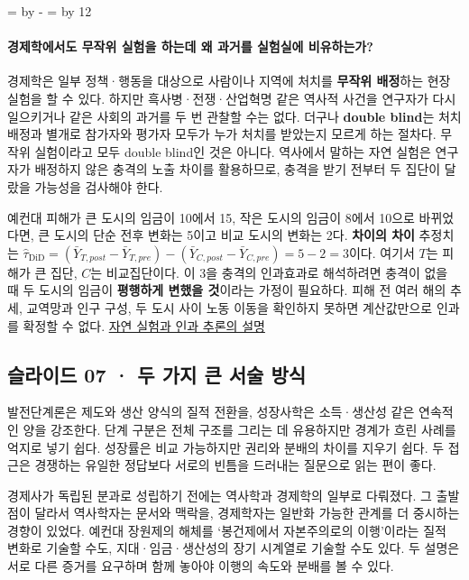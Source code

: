 \documentclass[10pt,a4paper]{article}
\newcommand{\ReserveQuestionSpace}{%
  \par\begingroup
  \dimen0=\pagegoal \advance\dimen0 by -\pagetotal
  \dimen2=\baselineskip \multiply\dimen2 by 12
  \ifdim\dimen0<\dimen2 \newpage\fi
  \endgroup}
\begin{document}
\ReserveQuestionSpace
\paragraph{경제학에서도 무작위 실험을 하는데 왜 과거를 실험실에 비유하는가?}
경제학은 일부 정책·행동을 대상으로 사람이나 지역에 처치를 \textbf{무작위 배정}하는 현장 실험을 할 수 있다. 하지만 흑사병·전쟁·산업혁명 같은 역사적 사건을 연구자가 다시 일으키거나 같은 사회의 과거를 두 번 관찰할 수는 없다. 더구나 \textbf{double blind}는 처치 배정과 별개로 참가자와 평가자 모두가 누가 처치를 받았는지 모르게 하는 절차다. 무작위 실험이라고 모두 double blind인 것은 아니다. 역사에서 말하는 자연 실험은 연구자가 배정하지 않은 충격의 노출 차이를 활용하므로, 충격을 받기 전부터 두 집단이 달랐을 가능성을 검사해야 한다.\par

예컨대 피해가 큰 도시의 임금이 10에서 15, 작은 도시의 임금이 8에서 10으로 바뀌었다면, 큰 도시의 단순 전후 변화는 5이고 비교 도시의 변화는 2다. \textbf{차이의 차이} 추정치는 $\widehat\tau_{\mathrm{DiD}}=(\bar Y_{T,post}-\bar Y_{T,pre})-(\bar Y_{C,post}-\bar Y_{C,pre})=5-2=3$이다. 여기서 $T$는 피해가 큰 집단, $C$는 비교집단이다. 이 3을 충격의 인과효과로 해석하려면 충격이 없을 때 두 도시의 임금이 \textbf{평행하게 변했을 것}이라는 가정이 필요하다. 피해 전 여러 해의 추세, 교역망과 인구 구성, 두 도시 사이 노동 이동을 확인하지 못하면 계산값만으로 인과를 확정할 수 없다. \href{https://www.nobelprize.org/uploads/2021/10/popular-economicsciencesprize2021-2.pdf}{자연 실험과 인과 추론의 설명}\par

\subsection{슬라이드 07 · 두 가지 큰 서술 방식}
발전단계론은 제도와 생산 양식의 질적 전환을, 성장사학은 소득·생산성 같은 연속적인 양을 강조한다. 단계 구분은 전체 구조를 그리는 데 유용하지만 경계가 흐린 사례를 억지로 넣기 쉽다. 성장률은 비교 가능하지만 권리와 분배의 차이를 지우기 쉽다. 두 접근은 경쟁하는 유일한 정답보다 서로의 빈틈을 드러내는 질문으로 읽는 편이 좋다.\par

경제사가 독립된 분과로 성립하기 전에는 역사학과 경제학의 일부로 다뤄졌다. 그 출발점이 달라서 역사학자는 문서와 맥락을, 경제학자는 일반화 가능한 관계를 더 중시하는 경향이 있었다. 예컨대 장원제의 해체를 ‘봉건제에서 자본주의로의 이행’이라는 질적 변화로 기술할 수도, 지대·임금·생산성의 장기 시계열로 기술할 수도 있다. 두 설명은 서로 다른 증거를 요구하며 함께 놓아야 이행의 속도와 분배를 볼 수 있다.\par
\end{document}
